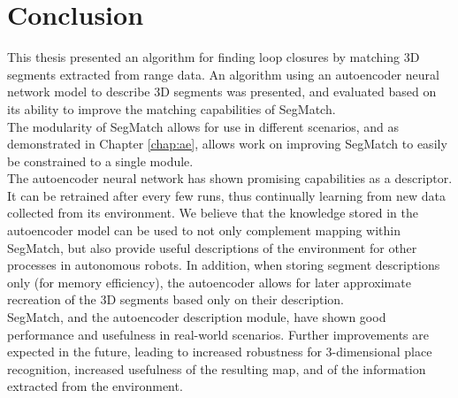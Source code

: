\chapter{Conclusion}
\label{chap:conclusion}

This thesis presented an algorithm for finding loop closures by matching 3D segments extracted from range data. An algorithm using an autoencoder neural network model to describe 3D segments was presented, and evaluated based on its ability to improve the matching capabilities of SegMatch.\\

The modularity of SegMatch allows for use in different scenarios, and as demonstrated in Chapter \ref{chap:ae}, allows work on improving SegMatch to easily be constrained to a single module.\\

The autoencoder neural network has shown promising capabilities as a descriptor. It can be retrained after every few runs, thus continually learning from new data collected from its environment. We believe that the knowledge stored in the autoencoder model can be used to not only complement mapping within SegMatch, but also provide useful descriptions of the environment for other processes in autonomous robots. In addition, when storing segment descriptions only (for memory efficiency), the autoencoder allows for later approximate recreation of the 3D segments based only on their description.\\

SegMatch, and the autoencoder description module, have shown good performance and usefulness in real-world scenarios. Further improvements are expected in the future, leading to increased robustness for 3-dimensional place recognition, increased usefulness of the resulting map, and of the information extracted from the environment.

